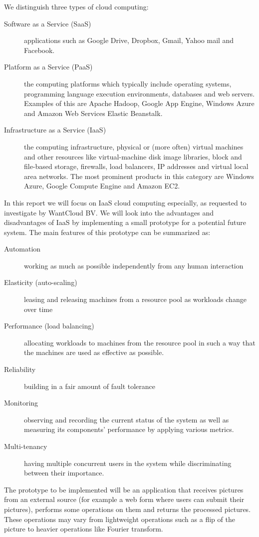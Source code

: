 \documentclass{stylesheet}
\begin{document}
We distinguish three types of cloud computing:
\begin{description}
	\item[Software as a Service (SaaS)] applications such as Google Drive, Dropbox, Gmail, Yahoo mail and Facebook.
	\item[Platform as a Service (PaaS)] the computing platforms which typically include operating systems, programming language execution environments, databases and web servers. Examples of this are Apache Hadoop, Google App Engine, Windows Azure and Amazon Web Services Elastic Beanstalk.
	\item[Infrastructure as a Service (IaaS)] the computing infrastructure, physical or (more often) virtual machines and other resources like virtual-machine disk image libraries, block and file-based storage, firewalls, load balancers, IP addresses and virtual local area networks. The most prominent products in this category are Windows Azure, Google Compute Engine and Amazon EC2.
\end{description}

In this report we will focus on IaaS cloud computing especially, as requested to investigate by WantCloud BV. We will look into the advantages and disadvantages of IaaS by implementing a small prototype for a potential future system. The main features of this prototype can be summarized as:
\begin{description}
	\item[Automation] working as much as possible independently from any human interaction
	\item[Elasticity (auto-scaling)] leasing and releasing machines from a resource pool as workloads change over time
	\item[Performance (load balancing)] allocating workloads to machines from the resource pool in such a way that the machines are used as effective as possible.
	\item[Reliability] building in a fair amount of fault tolerance
	\item[Monitoring] observing and recording the current status of the system as well as measuring its components' performance by applying various metrics.
	\item[Multi-tenancy] having multiple concurrent users in the system while discriminating between their importance.
\end{description}

The prototype to be implemented will be an application that receives pictures from an external source (for example a web form where users can submit their pictures), performs some operations on them and returns the processed pictures. These operations may vary from lightweight operations such as a flip of the picture to heavier operations like Fourier transform.
\end{document}

